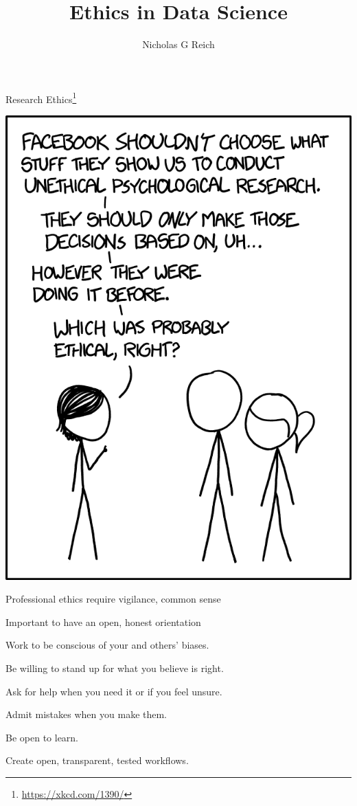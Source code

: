 \documentclass[table]{beamer}\usepackage[]{graphicx}\usepackage[]{color}
\title{Ethics in Data Science}
\author{Nicholas G Reich}
\begin{document}
\begin{frame}[plain]
	\titlepage
\end{frame}







\begin{frame}[fragile]{Research Ethics\footnote{\href{https://xkcd.com/1390/}{https://xkcd.com/1390/}}}

\includegraphics[width=.5\textwidth]{figure-static/research_ethics_2x}

\end{frame}



\begin{frame}[fragile]{Professional ethics require vigilance, common sense}

\begin{block}{Important to have an open, honest orientation}

\bi

\item Work to be conscious of your and others' biases.
\item Be willing to stand up for what you believe is right.
\item Ask for help when you need it or if you feel unsure.
\item Admit mistakes when you make them.
\item Be open to learn.
\item Create open, transparent, tested workflows.

\ei

\end{block}

\end{frame}
\end{document}
